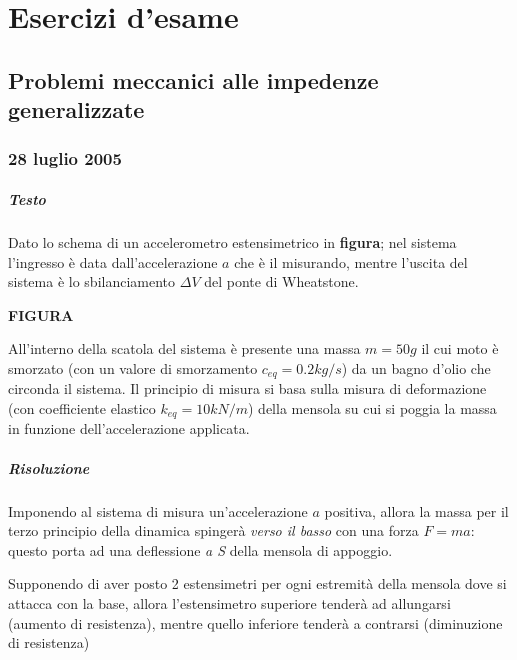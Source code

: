 \chapter{Esercizi d'esame}

\section{Problemi meccanici alle impedenze generalizzate}
	
	\subsection*{28 luglio 2005}
		\paragraph{Testo} Dato lo schema di un accelerometro estensimetrico in \textbf{figura}; nel sistema l'ingresso è data dall'accelerazione $a$ che è il misurando, mentre l'uscita del sistema è lo sbilanciamento $\Delta V$ del ponte di Wheatstone. 
		
		\textbf{FIGURA}
	
		All'interno della scatola del sistema è presente una massa $m = 50g$ il cui moto è smorzato (con un valore di smorzamento $c_{eq} = 0.2 kg/s$) da un bagno d'olio che circonda il sistema. Il principio di misura si basa sulla misura di deformazione (con coefficiente elastico $k_{eq} = 10kN/m$) della mensola su cui si poggia la massa in funzione dell'accelerazione applicata.
		
		\paragraph{Risoluzione} Imponendo al sistema di misura un'accelerazione $a$ positiva, allora la massa per il terzo principio della dinamica spingerà \textit{verso il basso} con una forza $F = ma$: questo porta ad una deflessione \textit{a S} della mensola di appoggio.
		
		Supponendo di aver posto 2 estensimetri per ogni estremità della mensola dove si attacca con la base, allora l'estensimetro superiore tenderà ad allungarsi (aumento di resistenza), mentre quello inferiore tenderà a contrarsi (diminuzione di resistenza)
		
		
		
		
		